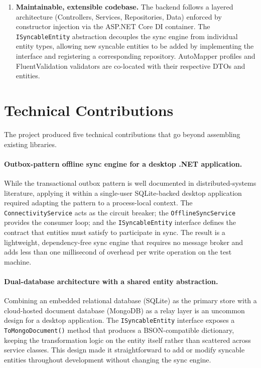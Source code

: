 \begin{enumerate}
  \item \textbf{Maintainable, extensible codebase.}
        The backend follows a layered architecture (Controllers, Services, Repositories,
        Data) enforced by constructor injection via the ASP.NET Core DI container.
        The \texttt{ISyncableEntity} abstraction decouples the sync engine from
        individual entity types, allowing new syncable entities to be added by
        implementing the interface and registering a corresponding repository.
        AutoMapper profiles and FluentValidation validators are co-located with their
        respective DTOs and entities.

\end{enumerate}

\section{Technical Contributions}\label{sec:concl_contributions}

The project produced five technical contributions that go beyond assembling existing
libraries.

\paragraph{Outbox-pattern offline sync engine for a desktop .NET application.}
While the transactional outbox pattern is well documented in distributed-systems
literature, applying it within a single-user SQLite-backed desktop application required
adapting the pattern to a process-local context.
The \texttt{ConnectivityService} acts as the circuit breaker; the
\texttt{OfflineSyncService} provides the consumer loop; and the \texttt{ISyncableEntity}
interface defines the contract that entities must satisfy to participate in sync.
The result is a lightweight, dependency-free sync engine that requires no message broker
and adds less than one millisecond of overhead per write operation on the test machine.

\paragraph{Dual-database architecture with a shared entity abstraction.}
Combining an embedded relational database (SQLite) as the primary store with a
cloud-hosted document database (MongoDB) as a relay layer is an uncommon design for a
desktop application.
The \texttt{ISyncableEntity} interface exposes a \texttt{ToMongoDocument()} method that
produces a BSON-compatible dictionary, keeping the transformation logic on the entity
itself rather than scattered across service classes.
This design made it straightforward to add or modify syncable entities throughout
development without changing the sync engine.

